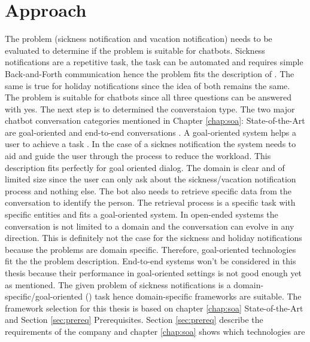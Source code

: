
\section{Approach}
The problem (sickness notification and vacation notification) needs to be evaluated to determine if the problem is suitable for chatbots.
Sickness notifications are a repetitive task, the task can be automated and requires simple Back-and-Forth communication hence the problem fits the description of \citet{buiildChatbotsPython}.
The same is true for holiday notifications since the idea of both remains the same.
The problem is suitable for chatbots since all three questions can be answered with yes.
The next step is to determined the converstaion type.
The two major chatbot conversation categories mentioned in Chapter \ref{chap:soa}: State-of-the-Art are goal-oriented 
and end-to-end conversations \cite{williams2017hybrid, bordes2016learning, rahman2017programming}.
A goal-oriented system helps a user to achieve a task \cite{rahman2017programming}.
In the case of a sicknes notification the system needs to aid and guide the user through the process to reduce the workload.
This description fits perfectly for goal oriented dialog.
The domain is clear and of limited size since the user can only ask about the sickness/vacation notification process and nothing else.
The bot also needs to retrieve specific data from the conversation to identify the person.
The retrieval process is a specific task with specific entities and fits a goal-oriented system.
In open-ended systems the conversation is not limited to a domain and the conversation can evolve in any direction.
This is definitely not the case for the sickness and holiday notifications because the problems are domain specific.
Therefore, goal-oriented technologies fit the the problem description.
End-to-end systems won't be considered in this thesis because their performance in goal-oriented settings is not good enough yet as 
\citet{bordes2016learning} mentioned.
The given problem of sickness notifications is a domain-specific/goal-oriented 
(\citet{deshpande2017survey, luis2015williams, braunEvaluatingNLU, williams2017hybrid}) 
task hence domain-specific frameworks are suitable.
The framework selection for this thesis is based on chapter \ref{chap:soa} State-of-the-Art and Section \ref{sec:prereq} Prerequisites.
Section \ref{sec:prereq} describe the requirements of the company and chapter \ref{chap:soa} shows which technologies are 

